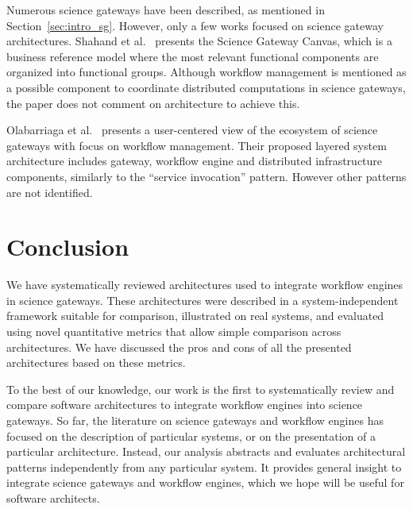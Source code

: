 \documentclass[preprint,3p,twocolumn]{elsarticle}
\begin{document}
Numerous science gateways have been described, as mentioned in
Section~\ref{sec:intro_sg}. However, only a few works focused on
science gateway architectures. Shahand et al.~\cite{shahand:2015ab}
presents the Science Gateway Canvas, which is a business reference
model where the most relevant functional components are organized into
functional groups. Although workflow management is mentioned as a
possible component to coordinate distributed computations in science
gateways, the paper does not comment on architecture to achieve this.

Olabarriaga et al.~\cite{olabarriaga2014} presents a user-centered
view of the ecosystem of science gateways with focus on workflow
management. Their proposed layered system architecture includes
gateway, workflow engine and distributed infrastructure components,
similarly to the ``service invocation'' pattern. However other patterns
are not identified.

\section{Conclusion}

We have systematically reviewed architectures used to integrate
workflow engines in science gateways. These architectures were
described in a system-independent framework suitable for comparison,
illustrated on real systems, and evaluated using novel quantitative
metrics that allow simple comparison across architectures. We have
discussed the pros and cons of all the presented architectures based
on these metrics.

To the best of our knowledge, our work is the first to systematically
review and compare software architectures  to integrate workflow
engines into science gateways. So far, the literature on science gateways and
workflow engines has focused on the description of particular systems,
or on the presentation of a particular architecture.  Instead, our
analysis abstracts and evaluates architectural patterns independently
from any particular system. It provides general insight to integrate
science gateways and workflow engines, which we hope will be useful
for software architects.

\end{document}
